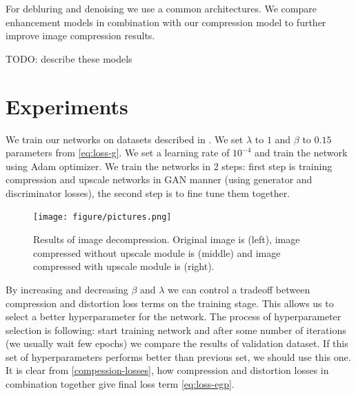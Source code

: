 For debluring and denoising we use a common architectures. We compare enhancement models \cite{jiang_towards_2021, zhang2017learning, zhang2020plug} in combination with our compression model to further improve image compression results.

TODO: describe these models

\chapter{Experiments}

We train our networks on datasets described in . We set $\lambda$ to $1$ and $\beta$ to $0.15$ parameters from \ref{eq:loss-g}. We set a learning rate of $10^{-4}$ and train the network using Adam optimizer. We train the networks in 2 steps: first step is training compression and upscale networks in GAN manner (using generator and discriminator losses), the second step is to fine tune them together.

\begin{figure}[!ht]
    \centering
    \texttt{[image: figure/pictures.png]}
    \caption{Results of image decompression. Original image is (left), image compressed without upscale module is (middle) and image compressed with upscale module is (right).}
    \label{road}
\end{figure}

By increasing and decreasing $\beta$ and $\lambda$ we can control a tradeoff between compression and distortion loss terms on the training stage. This allows us to select a better hyperparameter for the network. The process of hyperparameter selection is following: start training network and after some number of iterations (we usually wait few epochs) we compare the results of validation dataset. If this set of hyperparameters performs better than previous set, we should use this one. It is clear from \ref{compession-losses}, how compression and distortion losses in combination together give final loss term \ref{eq:loss-egp}.

